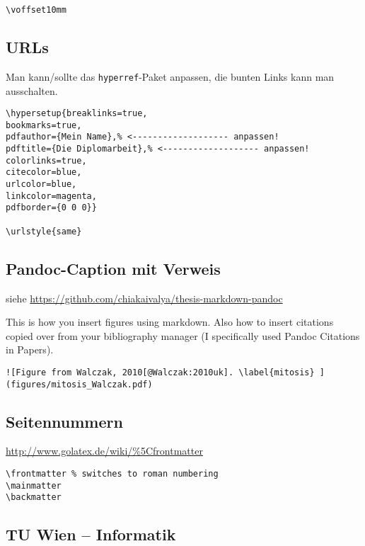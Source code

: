 \begin{lstlisting}
\voffset10mm
\end{lstlisting}

\subsection{URLs}\label{urls}

Man kann/sollte das \lstinline!hyperref!-Paket anpassen, die bunten
Links kann man ausschalten.

\begin{lstlisting}
\hypersetup{breaklinks=true,
bookmarks=true,
pdfauthor={Mein Name},% <------------------- anpassen!
pdftitle={Die Diplomarbeit},% <------------------- anpassen!
colorlinks=true,
citecolor=blue,
urlcolor=blue,
linkcolor=magenta,
pdfborder={0 0 0}}

\urlstyle{same}
\end{lstlisting}

\subsection{Pandoc-Caption mit
Verweis}\label{pandoc-caption-mit-verweis}

siehe \url{https://github.com/chiakaivalya/thesis-markdown-pandoc}

This is how you insert figures using markdown. Also how to insert
citations copied over from your bibliography manager (I specifically
used Pandoc Citations in Papers).

\begin{lstlisting}
![Figure from Walczak, 2010[@Walczak:2010uk]. \label{mitosis} ](figures/mitosis_Walczak.pdf)
\end{lstlisting}

\subsection{Seitennummern}\label{seitennummern}

\url{http://www.golatex.de/wiki/\%5Cfrontmatter}

\begin{lstlisting}
\frontmatter % switches to roman numbering
\mainmatter
\backmatter
\end{lstlisting}

\subsection{TU Wien -- Informatik}\label{tu-wien-informatik}

